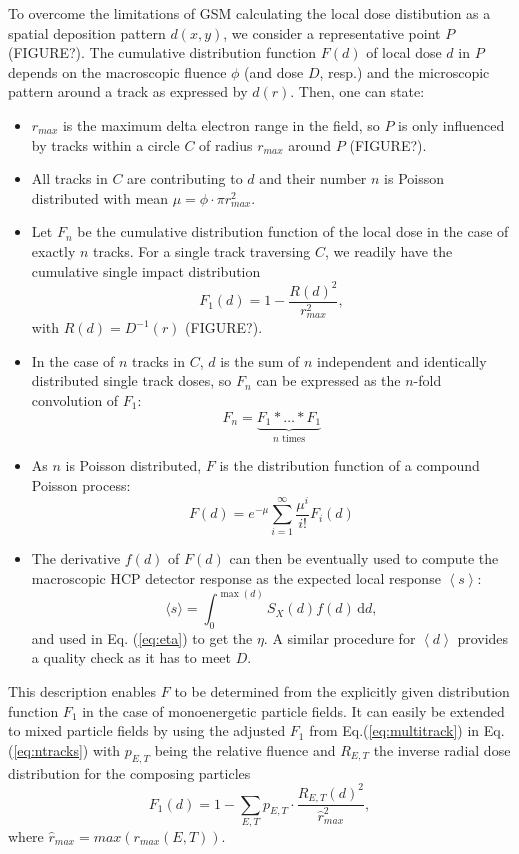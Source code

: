 To overcome the limitations of GSM calculating the local dose distibution as a spatial deposition pattern $d(x,y)$, we consider a representative point $P$ (FIGURE?). The cumulative distribution function $F(d)$ of local dose $d$ in $P$ depends on the macroscopic fluence $\phi$ (and dose $D$, resp.) and the microscopic pattern around a track as expressed by $d(r)$. Then, one can state:
\begin{itemize}
	\item {$r_{max}$ is the maximum delta electron range in the field, so $P$ is only influenced by tracks within a circle $C$ of radius $r_{max}$ around $P$ (\mbox{FIGURE?}).}
	\item {All tracks in $C$ are contributing to $d$ and their number $n$ is Poisson distributed with mean $\mu=\phi\cdot\pi r_{max}^2$.}
	\item {Let $F_n$ be the cumulative distribution function of the local dose in the case of exactly $n$ tracks. For a single track traversing $C$, we readily have the cumulative single impact distribution
		\begin{equation}\label{eq:singletrack}
			F_1(d)=1-\frac{R(d)^2}{r_{max}^2},
		\end{equation}
		with $R(d)=D^{-1}(r)$ (\mbox{FIGURE?}).}
	\item {In the case of $n$ tracks in $C$, $d$ is the sum of $n$ independent and identically distributed single track doses, so $F_n$ can be expressed as the $n$-fold convolution of $F_1$:
		\begin{equation}\label{eq:ntracks}
			F_n=\underbrace{F_1*\ldots*F_1}_{\mbox{$n$ times}}
		\end{equation}
	}
	\item {As $n$ is Poisson distributed, $F$ is the distribution function of a compound Poisson process:
		\begin{equation}
			F(d)=e^{-\mu}\sum^{\infty}_{i=1}{\frac{\mu^i}{i!}F_i(d)}
		\end{equation}
	}
	\item {The derivative $f(d)$ of $F(d)$ can then be eventually used to compute the macroscopic HCP detector response as the expected local response $\left\langle s\right\rangle$:
		\begin{equation}
		  \langle s \rangle= \int_0^{\max(d)} S_X(d) f(d)\, \mathrm{d}d,
		\end{equation}
		and used in Eq. (\ref{eq:eta}) to get the $\eta$. A similar procedure for $\left\langle d\right\rangle$ provides a quality check as it has to meet $D$.
	}
\end{itemize}
This description enables $F$ to be determined from the explicitly given distribution function $F_1$ in the case of monoenergetic particle fields. It can easily be extended to mixed particle fields by using the adjusted $F_1$ from Eq.(\ref{eq:multitrack}) in Eq.(\ref{eq:ntracks}) with $p_{E,T}$ being the relative fluence and $R_{E,T}$ the inverse radial dose distribution for the composing particles
\begin{equation}\label{eq:multitrack}
  F_1(d)=1-\sum_{E,T}p_{E,T}\cdot\frac{R_{E,T}(d)^2}{\hat{r}_{max}^2},
\end{equation}
where $\hat{r}_{max}=max(r_{max}(E,T))$.

